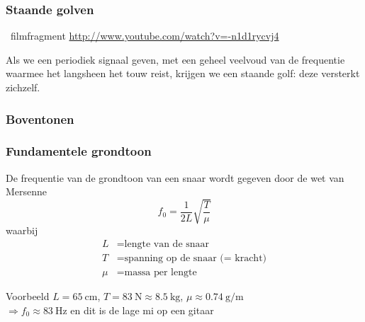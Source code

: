 \documentclass[compress, darktitle, framenumber, handout, totalframenumber]{beamer}
\begin{document}
\begin{frame}
  \frametitle{Staande golven}

  \begin{block}{\Forward\ filmfragment}
    \url{http://www.youtube.com/watch?v=-n1d1rycvj4}
  \end{block}

  \pause

  Als we een periodiek signaal geven, met een geheel veelvoud van de frequentie waarmee het langsheen het touw reist, krijgen we een \alert{staande golf}: deze versterkt zichzelf.
\end{frame}

\begin{frame}
  \frametitle{Boventonen}

  \centering
\end{frame}

\begin{frame}
  \frametitle{Fundamentele grondtoon}

  De frequentie van de grondtoon van een snaar wordt gegeven door de \alert{wet van Mersenne}
  \begin{equation}
    f_0=\frac{1}{2L}\sqrt{\frac{T}{\mu}}
  \end{equation}
  waarbij
  \begin{equation}
    \begin{aligned}
      L&=\text{lengte van de snaar} \\
      T&=\text{spanning op de snaar (= kracht)} \\
      \mu&=\text{massa per lengte}
    \end{aligned}
  \end{equation}
  \pause
  \begin{block}{Voorbeeld}
    $L=\SI{65}{\centi\meter}$, $T=\SI{83}{\newton}\approx\SI{8.5}{\kilo\gram}$, $\mu\approx\SI{0.74}{\gram\per\meter}$ \\
    $\Rightarrow f_0\approx\SI{83}{\hertz}$ en dit is de lage mi op een gitaar
  \end{block}
\end{frame}
\end{document}
